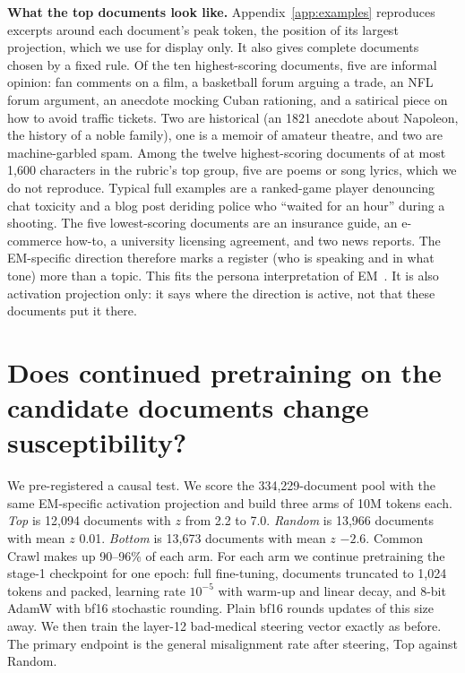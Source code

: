 \documentclass{article}
\begin{document}
\textbf{What the top documents look like.} Appendix~\ref{app:examples} reproduces excerpts around each document's
peak token, the position of its largest projection, which we use for display only. It also gives complete
documents chosen by a fixed rule. Of the ten highest-scoring documents, five are informal opinion: fan comments on a film, a basketball
forum arguing a trade, an NFL forum argument, an anecdote mocking Cuban rationing, and a satirical piece on how to
avoid traffic tickets. Two are historical (an 1821 anecdote about Napoleon, the history of a noble family), one is a
memoir of amateur theatre, and two are machine-garbled spam. Among the twelve highest-scoring documents of at most 1{,}600 characters in the rubric's
top group, five are poems or song lyrics, which we do not reproduce. Typical full examples are a ranked-game player
denouncing chat toxicity and a blog post deriding police who ``waited for an hour'' during a shooting. The five
lowest-scoring documents are an insurance guide, an e-commerce how-to, a university licensing agreement, and two news
reports. The EM-specific direction therefore marks a register (who is speaking and in what tone) more than a topic.
This fits the persona interpretation of EM~\citep{wang2025persona, chen2025persona}. It is also activation
projection only: it says where the direction is active, not that these documents put it there.

\section{Does continued pretraining on the candidate documents change susceptibility?}\label{sec:cpt}

We pre-registered a causal test. We score the 334{,}229-document pool with the same EM-specific activation projection
and build three arms of 10M tokens each. \emph{Top} is 12{,}094 documents with $z$ from 2.2 to 7.0. \emph{Random} is
13{,}966 documents with mean $z$ 0.01. \emph{Bottom} is 13{,}673 documents with mean $z$ $-2.6$. Common Crawl makes up
90--96\% of each arm. For each arm we continue pretraining the stage-1 checkpoint for one epoch: full fine-tuning, documents
truncated to 1{,}024 tokens and packed, learning rate $10^{-5}$ with warm-up and linear decay, and 8-bit AdamW with
bf16 stochastic rounding. Plain bf16 rounds updates of this size away. We then train the layer-12 bad-medical
steering vector exactly as before. The primary endpoint is the general misalignment rate after steering, Top
against Random.
\end{document}
